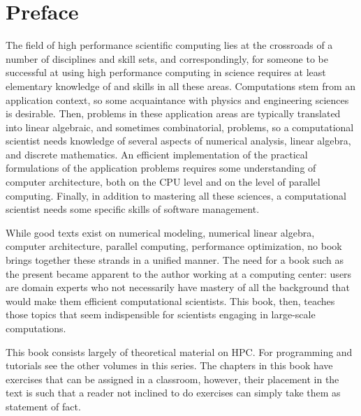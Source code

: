 
\thispagestyle{empty}
\section*{Preface}

The field of high performance scientific computing lies at the
crossroads of a number of disciplines and skill sets, and
correspondingly, for someone to be successful at using high performance
computing in science requires at least elementary knowledge of and
skills in all these areas.  Computations stem from an application
context, so some acquaintance with physics and engineering sciences is
desirable. Then, problems in these application areas are typically
translated into linear algebraic, and sometimes combinatorial,
problems, so a computational scientist needs knowledge of several
aspects of numerical analysis, linear algebra, and discrete
mathematics. An efficient implementation of the practical formulations
of the application problems requires some understanding of computer
architecture, both on the CPU level and on the level of parallel
computing. Finally, in addition to mastering all these sciences, a
computational scientist needs some specific skills of software
management.

While good texts exist on numerical
modeling, numerical linear algebra, computer architecture, parallel
computing, performance optimization, no book brings together these
strands in a unified manner. The need for a book such as the present
became apparent to the author working at a computing center:
users are domain experts who not necessarily have mastery
of all the background that would make them
efficient computational scientists. This book, then, teaches those
topics that seem indispensible for scientists
engaging in large-scale computations.

This book consists largely of theoretical material on HPC.
For programming and tutorials see the other volumes in this series.
The chapters in this book
have exercises that can be assigned in a classroom, however, their
placement in the text is such that a reader not inclined to do
exercises can simply take them as statement of fact.

